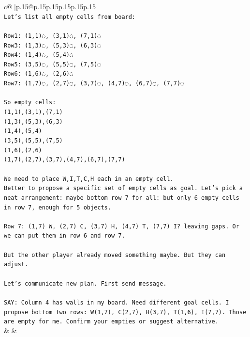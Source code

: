 \documentclass{article}
\begin{document}
{\begin{supertabular}{c@{$\;$}|p{.15\linewidth}@{}p{.15\linewidth}p{.15\linewidth}p{.15\linewidth}p{.15\linewidth}p{.15\linewidth}}
{{{\\ 
\texttt{Let’s list all empty cells from board:} \\
\\ 
\texttt{Row1: (1,1)◌, (3,1)◌, (7,1)◌  } \\
\texttt{Row3: (1,3)◌, (5,3)◌, (6,3)◌  } \\
\texttt{Row4: (1,4)◌, (5,4)◌  } \\
\texttt{Row5: (3,5)◌, (5,5)◌, (7,5)◌  } \\
\texttt{Row6: (1,6)◌, (2,6)◌  } \\
\texttt{Row7: (1,7)◌, (2,7)◌, (3,7)◌, (4,7)◌, (6,7)◌, (7,7)◌  } \\
\\ 
\texttt{So empty cells:  } \\
\texttt{(1,1),(3,1),(7,1)  } \\
\texttt{(1,3),(5,3),(6,3)  } \\
\texttt{(1,4),(5,4)  } \\
\texttt{(3,5),(5,5),(7,5)  } \\
\texttt{(1,6),(2,6)  } \\
\texttt{(1,7),(2,7),(3,7),(4,7),(6,7),(7,7)} \\
\\ 
\texttt{We need to place W,I,T,C,H each in an empty cell.  } \\
\texttt{Better to propose a specific set of empty cells as goal. Let's pick a neat arrangement: maybe bottom row 7 for all: but only 6 empty cells in row 7, enough for 5 objects.} \\
\\ 
\texttt{Row 7: (1,7) W, (2,7) C, (3,7) H, (4,7) T, (7,7) I? leaving gaps. Or we can put them in row 6 and row 7.} \\
\\ 
\texttt{But the other player already moved something maybe. But they can adjust.} \\
\\ 
\texttt{Let’s communicate new plan. First send message.} \\
\\ 
\texttt{SAY: Column 4 has walls in my board. Need different goal cells. I propose bottom two rows: W(1,7), C(2,7), H(3,7), T(1,6), I(7,7). Those are empty for me. Confirm your empties or suggest alternative.} \\
            }
        }
    }
    & & \\ \\


\end{supertabular}}
\end{document}
